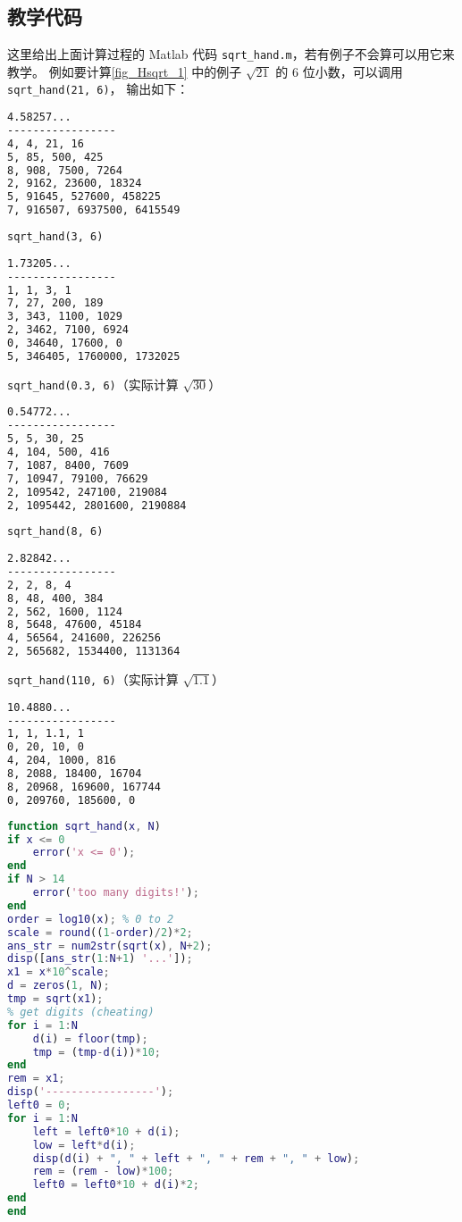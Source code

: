 \subsection{教学代码}
这里给出上面计算过程的 Matlab 代码 \verb`sqrt_hand.m`，若有例子不会算可以用它来教学。 例如要计算\autoref{fig_Hsqrt_1} 中的例子 $\sqrt{21}$ 的 6 位小数，可以调用 \verb`sqrt_hand(21, 6)`， 输出如下：
\begin{lstlisting}[language=bash]
4.58257...
-----------------
4, 4, 21, 16
5, 85, 500, 425
8, 908, 7500, 7264
2, 9162, 23600, 18324
5, 91645, 527600, 458225
7, 916507, 6937500, 6415549
\end{lstlisting}
\verb`sqrt_hand(3, 6)`
\begin{lstlisting}[language=bash]
1.73205...
-----------------
1, 1, 3, 1
7, 27, 200, 189
3, 343, 1100, 1029
2, 3462, 7100, 6924
0, 34640, 17600, 0
5, 346405, 1760000, 1732025
\end{lstlisting}
\verb`sqrt_hand(0.3, 6)`（实际计算 $\sqrt{30}$）
\begin{lstlisting}[language=bash]
0.54772...
-----------------
5, 5, 30, 25
4, 104, 500, 416
7, 1087, 8400, 7609
7, 10947, 79100, 76629
2, 109542, 247100, 219084
2, 1095442, 2801600, 2190884
\end{lstlisting}
\verb`sqrt_hand(8, 6)`
\begin{lstlisting}[language=bash]
2.82842...
-----------------
2, 2, 8, 4
8, 48, 400, 384
2, 562, 1600, 1124
8, 5648, 47600, 45184
4, 56564, 241600, 226256
2, 565682, 1534400, 1131364
\end{lstlisting}
\verb`sqrt_hand(110, 6)`（实际计算 $\sqrt{1.1}$）
\begin{lstlisting}[language=bash]
10.4880...
-----------------
1, 1, 1.1, 1
0, 20, 10, 0
4, 204, 1000, 816
8, 2088, 18400, 16704
8, 20968, 169600, 167744
0, 209760, 185600, 0
\end{lstlisting}

\begin{lstlisting}[language=matlab,caption=sqrt\_hand.m]
function sqrt_hand(x, N)
if x <= 0
    error('x <= 0');
end
if N > 14
    error('too many digits!');
end
order = log10(x); % 0 to 2
scale = round((1-order)/2)*2;
ans_str = num2str(sqrt(x), N+2);
disp([ans_str(1:N+1) '...']);
x1 = x*10^scale;
d = zeros(1, N);
tmp = sqrt(x1);
% get digits (cheating)
for i = 1:N
    d(i) = floor(tmp);
    tmp = (tmp-d(i))*10;
end
rem = x1;
disp('-----------------');
left0 = 0;
for i = 1:N
    left = left0*10 + d(i);
    low = left*d(i);
    disp(d(i) + ", " + left + ", " + rem + ", " + low);
    rem = (rem - low)*100;
    left0 = left0*10 + d(i)*2;
end
end
\end{lstlisting}
